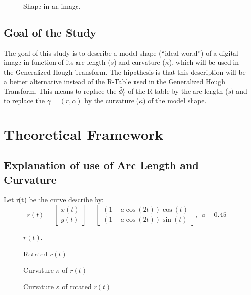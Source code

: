 \documentclass{ws-procs9x6}
\begin{document}
\begin{figure}
\centering
{}
\caption{Shape in an image.}
\label{fig:2}
\end{figure}


\subsection{Goal of the Study}
The goal of this study is to describe a model shape (``ideal world'')
of a digital image in function of its arc length ($s$) and curvature
($\kappa$), which will be used in the Generalized Hough Transform.
The hipothesis is that this description will be a better alternative
instead of the R-Table used in the Generalized Hough Transform. 
This means to replace the $\hat{\phi}\sp{\prime}_{i}$ of the R-table
by the arc length ($s$) and to replace the $\gamma=(r,\alpha)$ by the
curvature ($\kappa$) of the model shape.

\section{Theoretical Framework}
\subsection{Explanation of use of Arc Length and Curvature}
Let r(t) be the curve describe by:
$$r(t)=\begin{bmatrix} x(t)  \\ y(t)\end{bmatrix} = \begin{bmatrix}(1 - a\cos(2t))\cos(t) \\ (1 - a\cos(2t))\sin(t)\end{bmatrix}, \ \ a=0.45 $$

\begin{figure}[h!tpb]
\centering
{}
\caption{$r(t)$.}
\end{figure}


\begin{figure}[h!tpb]
\centering
{}
\caption{Rotated $r(t)$.}
\end{figure}


\begin{figure}[h!tpb]
\centering
{}
\caption{Curvature $\kappa$ of $r(t)$}
\end{figure}


\begin{figure}[h!tpb]
\centering
{}
\caption{Curvature $\kappa$ of rotated $r(t)$}
\end{figure}
\end{document}
